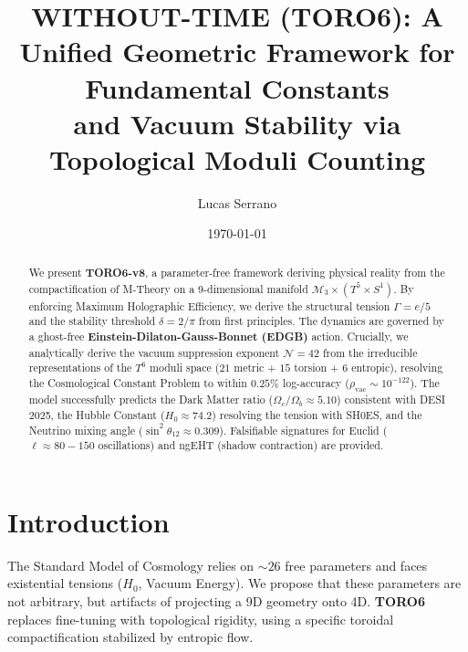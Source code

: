 \documentclass[aps,prd,twocolumn,superscriptaddress,showpacs,amsmath,amssymb,floatfix,nofootinbib]{revtex4-2}
\begin{document}
\title{WITHOUT-TIME (TORO6): A Unified Geometric Framework for Fundamental Constants \\ and Vacuum Stability via Topological Moduli Counting}

\author{Lucas Serrano}
\date{\today}

\begin{abstract}
We present \textbf{TORO6-v8}, a parameter-free framework deriving physical reality from the compactification of M-Theory on a 9-dimensional manifold $\mathcal{M}_3 \times (T^5 \times S^1)$. By enforcing Maximum Holographic Efficiency, we derive the structural tension $\Gamma = e/5$ and the stability threshold $\delta = 2/\pi$ from first principles. The dynamics are governed by a ghost-free \textbf{Einstein-Dilaton-Gauss-Bonnet (EDGB)} action.
Crucially, we analytically derive the vacuum suppression exponent $\mathcal{N}=42$ from the irreducible representations of the $T^6$ moduli space ($21$ metric + $15$ torsion + $6$ entropic), resolving the Cosmological Constant Problem to within $0.25\%$ log-accuracy ($\rho_{\text{vac}} \sim 10^{-122}$).
The model successfully predicts the Dark Matter ratio ($\Omega_c/\Omega_b \approx 5.10$) consistent with DESI 2025, the Hubble Constant ($H_0 \approx 74.2$) resolving the tension with SH0ES, and the Neutrino mixing angle ($\sin^2\theta_{12} \approx 0.309$). Falsifiable signatures for Euclid ($\ell \approx 80-150$ oscillations) and ngEHT (shadow contraction) are provided.
\end{abstract}

\maketitle

\section{Introduction}
The Standard Model of Cosmology relies on $\sim 26$ free parameters and faces existential tensions ($H_0$, Vacuum Energy). We propose that these parameters are not arbitrary, but artifacts of projecting a 9D geometry onto 4D. \textbf{TORO6} replaces fine-tuning with topological rigidity, using a specific toroidal compactification stabilized by entropic flow.

\end{document}
